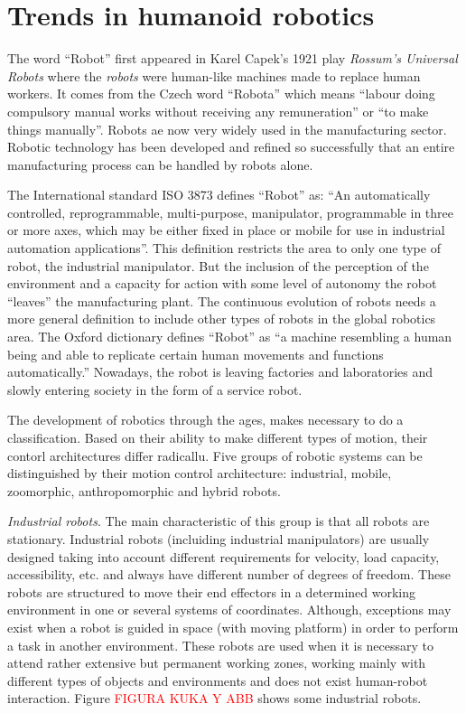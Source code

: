 \section{Trends in humanoid robotics}

The word ``Robot'' first appeared in Karel Capek's 1921 play \textit{Rossum's Universal Robots} where the \textit{robots} were human-like machines made to replace human workers. It comes from the Czech word ``Robota'' which means ``labour doing compulsory manual works without receiving any remuneration'' or ``to make things manually''. Robots ae now very widely used in the manufacturing sector. Robotic technology has been developed and refined so successfully that an entire manufacturing process can be handled by robots alone.

The International standard ISO 3873 defines ``Robot'' as: ``An automatically controlled, reprogrammable, multi-purpose, manipulator, programmable in three or more axes, which may be either fixed in place or mobile for use in industrial automation applications''. This definition restricts the area to only one type of robot, the industrial manipulator. But the inclusion of the perception of the environment and a capacity for action with some level of autonomy the robot “leaves” the manufacturing plant. The continuous evolution of robots needs a more general definition to include other types of robots in the global robotics area. The Oxford dictionary defines “Robot” as “a machine resembling a human being and able to replicate certain human movements and functions automatically.” Nowadays, the robot is leaving factories and laboratories and slowly entering society in the form of a service robot.

The development of robotics through the ages, makes necessary to do a classification. Based on their ability to make different types of motion, their contorl architectures differ radicallu. Five groups of robotic systems can be distinguished by their motion control architecture: industrial, mobile, zoomorphic, anthropomorphic and hybrid robots.

\textit{Industrial robots}. The main characteristic of this group is that all robots are stationary. Industrial robots (incluiding industrial manipulators) are usually designed taking into account different requirements for velocity, load capacity, accessibility, etc. and always have different number of degrees of freedom. These robots are structured to move their end effectors in a determined working environment in one or several systems of coordinates. Although, exceptions may exist when a robot is guided in space (with moving platform) in order to perform a task in another environment. These robots are used when it is necessary to attend rather extensive but permanent working zones, working mainly with different types of objects and environments and does not exist human-robot interaction. Figure \textcolor{red}{FIGURA KUKA Y ABB} shows some industrial robots.
 
